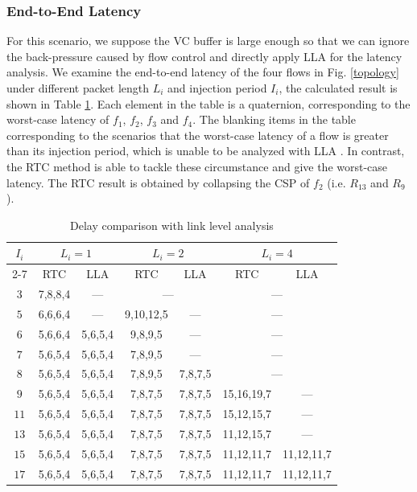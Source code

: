 \documentclass[10pt,journal]{IEEEtran}
\begin{document}
\subsubsection{End-to-End Latency}
For this scenario, we suppose the VC buffer is large enough so that we can ignore the back-pressure caused by flow control and directly apply LLA for the latency analysis. We examine the end-to-end latency of the four flows in Fig. \ref{topology} under different packet length $L_i$ and injection period $I_i$, the calculated result is shown in Table \ref{LLAvsRTC}. Each element in the table is a quaternion, corresponding to the worst-case latency of $f_1$, $f_2$, $f_3$ and $f_4$. The blanking items in the table corresponding to the scenarios that the worst-case latency of a flow is greater than its injection period, which is unable to be analyzed with LLA \cite{73}. In contrast, the RTC method is able to tackle these circumstance and give the worst-case latency. The RTC result is obtained by collapsing the CSP of $f_2$ (i.e. $R_{13}$ and $R_{9}$).
\begin{table}[htbp]
\centering
\caption{\label{LLAvsRTC}Delay comparison with link level analysis}
\begin{tabular}{|c|c|c|c|c|c|c|}
\hline
\multirow{3}{*}{$I_i$}  & \multicolumn{2}{|c|}{$L_i=1$} & \multicolumn{2}{|c|}{$L_i=2$}    &   \multicolumn{2}{|c|}{$L_i=4$} \\
\cline{2-7}
& RTC & LLA & RTC & LLA &   RTC &   LLA\\
\hline
$3$ &   7,8,8,4 &   --- &   \multicolumn{2}{|c|}{---}   &   \multicolumn{2}{|c|}{---}\\
\hline
$5$ &   6,6,6,4 &   --- &   9,10,12,5 &   ---   &   \multicolumn{2}{|c|}{---}\\
\hline
$6$ &   5,6,6,4 &   5,6,5,4 &   9,8,9,5 &   ---   &   \multicolumn{2}{|c|}{---}\\
\hline
$7$ &   5,6,5,4 &   5,6,5,4 &   7,8,9,5 &   --- &   \multicolumn{2}{|c|}{---}\\
\hline
$8$ &   5,6,5,4 &   5,6,5,4 &   7,8,9,5 &   7,8,7,5 &   \multicolumn{2}{|c|}{---}\\
\hline
$9$ &   5,6,5,4 &   5,6,5,4 &   7,8,7,5 &   7,8,7,5 &   15,16,19,7 &   --- \\
\hline
$11$    &   5,6,5,4 &   5,6,5,4 &   7,8,7,5 &   7,8,7,5 &   15,12,15,7  &   ---\\
\hline
$13$    &   5,6,5,4 &   5,6,5,4 &   7,8,7,5 &   7,8,7,5 &   11,12,15,7  &   ---\\
\hline
$15$    &   5,6,5,4 &   5,6,5,4 &   7,8,7,5 &   7,8,7,5 &   11,12,11,7  &   11,12,11,7\\
\hline
$17$    &   5,6,5,4 &   5,6,5,4 &   7,8,7,5 &   7,8,7,5 &   11,12,11,7  &   11,12,11,7\\
\hline
\end{tabular}
\end{table}
\end{document}
